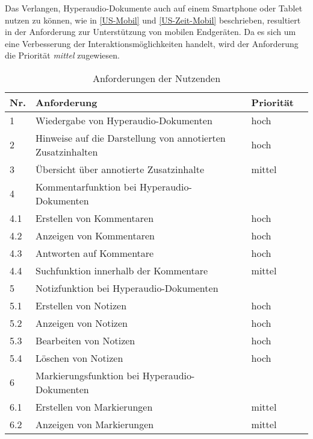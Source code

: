 Das Verlangen, Hyperaudio-Dokumente auch auf einem Smartphone oder Tablet nutzen zu können, wie in \ref{US-Mobil} und \ref{US-Zeit-Mobil} beschrieben, resultiert in der Anforderung zur Unterstützung von mobilen Endgeräten. Da es sich um eine Verbesserung der Interaktionsmöglichkeiten handelt, wird der Anforderung die Priorität \textit{mittel} zugewiesen.

\begin{table}[!ht]
\def\arraystretch{1.4}
\caption{Anforderungen der Nutzenden}
\label{tab:AnforderungenNutzenden}
\begin{tabularx}{\textwidth}{lXll}      
    \hline
    Nr. & Anforderung & Priorität
    \\\hline
    1 & Wiedergabe von Hyperaudio-Dokumenten & hoch\\
    2 & Hinweise auf die Darstellung von annotierten Zusatzinhalten & hoch\\
    3 & Übersicht über annotierte Zusatzinhalte & mittel\\
    4 & Kommentarfunktion bei Hyperaudio-Dokumenten & \\
    4.1 & \hspace*{0.5cm} Erstellen von Kommentaren & hoch\\
    4.2 & \hspace*{0.5cm} Anzeigen von Kommentaren & hoch\\
    4.3 & \hspace*{0.5cm} Antworten auf Kommentare & hoch\\
    4.4 & \hspace*{0.5cm} Suchfunktion innerhalb der Kommentare & mittel\\ 
    5 & Notizfunktion bei Hyperaudio-Dokumenten & \\
    5.1 & \hspace*{0.5cm} Erstellen von Notizen & hoch\\
    5.2 & \hspace*{0.5cm} Anzeigen von Notizen & hoch\\
    5.3 & \hspace*{0.5cm} Bearbeiten von Notizen & hoch\\
   	5.4 & \hspace*{0.5cm} Löschen von Notizen & hoch\\
    6 & Markierungsfunktion bei Hyperaudio-Dokumenten & \\
    6.1 & \hspace*{0.5cm} Erstellen von Markierungen & mittel\\
    6.2 & \hspace*{0.5cm} Anzeigen von Markierungen & mittel\\

\end{tabularx}
\end{table}
